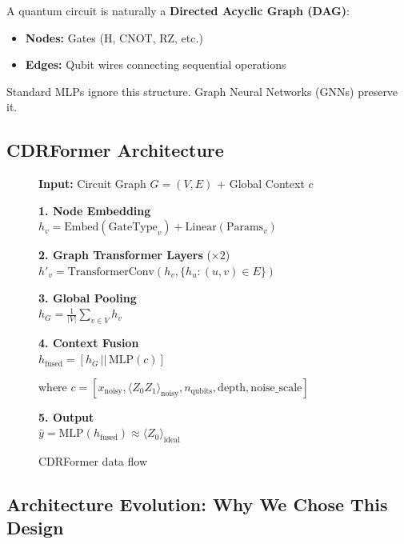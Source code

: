 \documentclass[11pt, a4paper]{article}
\begin{document}
A quantum circuit is naturally a \textbf{Directed Acyclic Graph (DAG)}:
\begin{itemize}
    \item \textbf{Nodes:} Gates (H, CNOT, RZ, etc.)
    \item \textbf{Edges:} Qubit wires connecting sequential operations
\end{itemize}

Standard MLPs ignore this structure. Graph Neural Networks (GNNs) preserve it.

\subsection{CDRFormer Architecture}

\begin{figure}[H]
\centering
\begin{tcolorbox}[width=0.9\textwidth]
\textbf{Input:} Circuit Graph $G = (V, E)$ + Global Context $c$

\vspace{0.3cm}
\textbf{1. Node Embedding} \\
$h_v = \text{Embed}(\text{GateType}_v) + \text{Linear}(\text{Params}_v)$

\vspace{0.3cm}
\textbf{2. Graph Transformer Layers} ($\times 2$) \\
$h'_v = \text{TransformerConv}(h_v, \{h_u : (u,v) \in E\})$

\vspace{0.3cm}
\textbf{3. Global Pooling} \\
$h_G = \frac{1}{|V|} \sum_{v \in V} h_v$

\vspace{0.3cm}
\textbf{4. Context Fusion} \\
$h_{\text{fused}} = [h_G \, || \, \text{MLP}(c)]$

where $c = [x_{\text{noisy}}, \langle Z_0 Z_1 \rangle_{\text{noisy}}, n_{\text{qubits}}, \text{depth}, \text{noise\_scale}]$

\vspace{0.3cm}
\textbf{5. Output} \\
$\hat{y} = \text{MLP}(h_{\text{fused}}) \approx \langle Z_0 \rangle_{\text{ideal}}$
\end{tcolorbox}
\caption{CDRFormer data flow}
\end{figure}

\subsection{Architecture Evolution: Why We Chose This Design}
\end{document}
